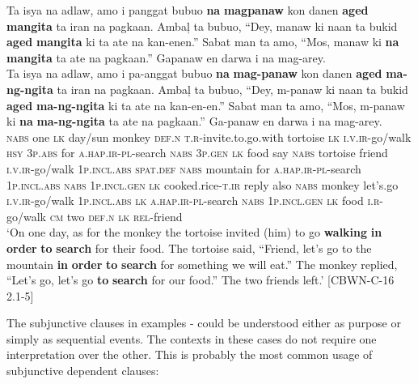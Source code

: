 \ea
\label{bkm:Ref474396378}
Ta  isya  na  adlaw,  amo  i  panggat  bubuo \textbf{na}  \textbf{magpanaw}  kon  danen  \textbf{aged}  \textbf{mangita}  ta  iran  na pagkaan.  Ambaļ  ta  bubuo,  “Dey,  manaw  ki  naan ta  bukid  \textbf{aged}  \textbf{mangita}  ki  ta  ate na  kan-enen.”  Sabat  man  ta  amo,  “Mos,  manaw  ki \textbf{na}  \textbf{mangita}  ta  ate  na  pagkaan.”  Gapanaw  en darwa  i  na  mag-arey. \smallskip\\
\gll Ta  isya  na  adlaw,  amo  i  pa-anggat  bubuo \textbf{na}  \textbf{mag-panaw}  kon  danen  \textbf{aged}  \textbf{ma-ng-ngita}  ta  iran  na pagkaan.  Ambaļ  ta  bubuo,  “Dey,  m-panaw  ki  naan ta  bukid  \textbf{aged}  \textbf{ma-ng-ngita}  ki  ta  ate na  kan-en-en.”  Sabat  man  ta  amo,  “Mos,  m-panaw  ki \textbf{na}  \textbf{ma-ng-ngita}  ta  ate  na  pagkaan.”  Ga-panaw  en darwa  i  na  mag-arey. \\
\textsc{nabs}  one  \textsc{lk}  day/sun  monkey  \textsc{def.n}  \textsc{t.r}-invite.to.go.with  tortoise
\textsc{lk}  \textsc{i.v.ir}-go/walk  \textsc{hsy}  3\textsc{p.abs}  for  \textsc{a.hap.ir}-\textsc{pl}-search  \textsc{nabs}  3\textsc{p.gen}  \textsc{lk}
food  say  \textsc{nabs}  tortoise  friend  \textsc{i.v.ir}-go/walk  1\textsc{p.incl.abs}  \textsc{spat.def}
\textsc{nabs}  mountain  for  \textsc{a.hap.ir}-\textsc{pl}-search  1\textsc{p.incl.abs}  \textsc{nabs}  1\textsc{p.incl.gen}
\textsc{lk}  cooked.rice-\textsc{t.ir}  reply  also  \textsc{nabs}  monkey  let’s.go  \textsc{i.v.ir}-go/walk  1\textsc{p.incl.abs} \textsc{lk}  \textsc{a.hap.ir}-\textsc{pl}-search  \textsc{nabs}  1\textsc{p.incl.gen}  \textsc{lk}  food  \textsc{i.r}-go/walk  \textsc{cm}
two  \textsc{def.n}  \textsc{lk}  \textsc{rel}-friend \\
\glt `On one day, as for the monkey the tortoise invited (him) to go \textbf{walking} \textbf{in} \textbf{order} \textbf{to} \textbf{search} for their food. The tortoise said, “Friend, let’s go to the mountain \textbf{in} \textbf{order} \textbf{to} \textbf{search} for something we will eat.” The monkey replied, “Let’s go, let’s go \textbf{to} \textbf{search} for our food.” The two friends left.’ [CBWN-C-16 2.1-5]
\z

The subjunctive clauses in examples - could be understood either as purpose or simply as sequential events. The contexts in these cases do not require one interpretation over the other. This is probably the most common usage of subjunctive dependent clauses:

